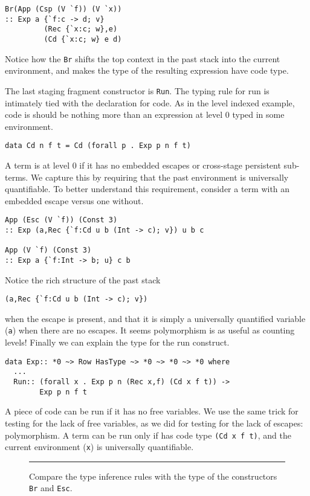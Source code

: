 \documentclass{sigplanconf}
\begin{document}
\begin{verbatim}
Br(App (Csp (V `f)) (V `x))
:: Exp a {`f:c -> d; v} 
         (Rec {`x:c; w},e) 
         (Cd {`x:c; w} e d)
\end{verbatim}
Notice how the {\tt Br} shifts the top context in the past stack into 
the current environment, and makes the type of the resulting
expression have code type.

The last staging fragment constructor is {\tt Run}. The typing
rule for run is intimately tied with the declaration for code.
As in the level indexed example, code is should be nothing
more than an expression at level 0 typed in some environment.
\begin{verbatim}
data Cd n f t = Cd (forall p . Exp p n f t)
\end{verbatim}
A term is at level 0 if it has no embedded escapes or cross-stage
persistent sub-terms. We capture this by requiring that the past
environment is universally quantifiable. To better understand
this requirement, consider a term
with an embedded escape versus one without.
\begin{verbatim}
App (Esc (V `f)) (Const 3)
:: Exp (a,Rec {`f:Cd u b (Int -> c); v}) u b c

App (V `f) (Const 3)
:: Exp a {`f:Int -> b; u} c b
\end{verbatim}
Notice the rich structure of the past stack
\begin{verbatim}
(a,Rec {`f:Cd u b (Int -> c); v})
\end{verbatim}
when the escape is present, and that it is simply a universally quantified 
variable ({\tt a}) when there are no escapes. It seems polymorphism
is as useful as counting levels! Finally we can explain the type for the
run construct.
\begin{verbatim}
data Exp:: *0 ~> Row HasType ~> *0 ~> *0 ~> *0 where
  ...
  Run:: (forall x . Exp p n (Rec x,f) (Cd x f t)) -> 
        Exp p n f t
\end{verbatim}

A piece of code can be run if it has no free variables. We use the same trick
for testing for the lack of free variables, as we did for testing for the lack of
escapes: polymorphism. A term can be run only if has code type {\tt (Cd x f
t)}, and the current environment ({\tt x}) is universally quantifiable.


\begin{figure*}[t]
\vspace{1.5ex}
\begin{center}
\end{center}

\vspace*{-.4in}
\caption{Compare the type inference rules with the type
of the constructors {\tt Br} and {\tt Esc}. }\label{typerules}
\hrule
\end{figure*}
\end{document}
